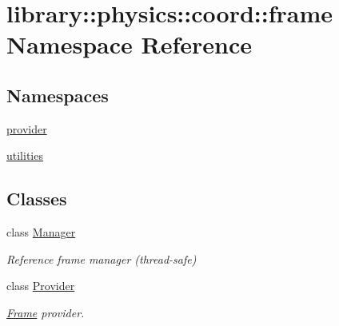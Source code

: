 \hypertarget{namespacelibrary_1_1physics_1_1coord_1_1frame}{}\section{library\+:\+:physics\+:\+:coord\+:\+:frame Namespace Reference}
\label{namespacelibrary_1_1physics_1_1coord_1_1frame}
\subsection*{Namespaces}
\begin{DoxyCompactItemize}
\item 
 \hyperlink{namespacelibrary_1_1physics_1_1coord_1_1frame_1_1provider}{provider}
\item 
 \hyperlink{namespacelibrary_1_1physics_1_1coord_1_1frame_1_1utilities}{utilities}
\end{DoxyCompactItemize}
\subsection*{Classes}
\begin{DoxyCompactItemize}
\item 
class \hyperlink{classlibrary_1_1physics_1_1coord_1_1frame_1_1_manager}{Manager}
\begin{DoxyCompactList}\small\item\em Reference frame manager (thread-\/safe) \end{DoxyCompactList}\item 
class \hyperlink{classlibrary_1_1physics_1_1coord_1_1frame_1_1_provider}{Provider}
\begin{DoxyCompactList}\small\item\em \hyperlink{classlibrary_1_1physics_1_1coord_1_1_frame}{Frame} provider. \end{DoxyCompactList}\end{DoxyCompactItemize}
